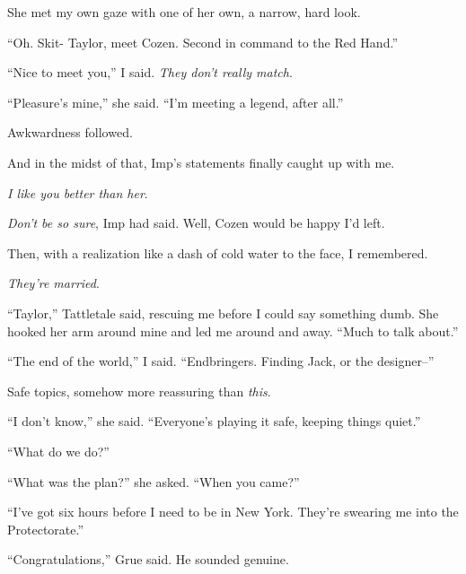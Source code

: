 She met my own gaze with one of her own, a narrow, hard look.



``Oh.  Skit- Taylor, meet Cozen.  Second in command to the Red Hand.''



``Nice to meet you,'' I said.  \emph{They don't really match}.



``Pleasure's mine,'' she said.  ``I'm meeting a legend, after all.''



Awkwardness followed.



And in the midst of that, Imp's statements finally caught up with me.



\emph{I like you better than her}.



\emph{Don't be so sure}, Imp had said.  Well, Cozen would be happy I'd left.



Then, with a realization like a dash of cold water to the face, I remembered.



\emph{They're married}.



``Taylor,'' Tattletale said, rescuing me before I could say something dumb.  She hooked her arm around mine and led me around and away.  ``Much to talk about.''



``The end of the world,'' I said.  ``Endbringers.  Finding Jack, or the designer--''



Safe topics, somehow more reassuring than \emph{this}.



``I don't know,'' she said.  ``Everyone's playing it safe, keeping things quiet.''



``What do we do?''



``What was the plan?'' she asked.  ``When you came?''



``I've got six hours before I need to be in New York.  They're swearing me into the Protectorate.''



``Congratulations,'' Grue said.  He sounded genuine.



